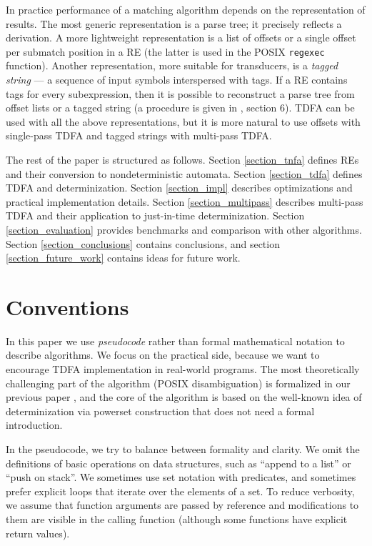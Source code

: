 \documentclass[]{article}
\begin{document}
In practice performance of a matching algorithm depends on the representation of results.
The most generic representation is a parse tree; it precisely reflects a derivation.
A more lightweight representation is a list of offsets or a single offset per submatch position in a RE
(the latter is used in the POSIX \texttt{regexec} function).
Another representation, more suitable for transducers, is a \emph{tagged string} ---
a sequence of input symbols interspersed with tags.
If a RE contains tags for every subexpression,
then it is possible to reconstruct a parse tree from offset lists or a tagged string (a procedure is given in \cite{BorTro19}, section 6).
TDFA can be used with all the above representations,
but it is more natural to use offsets with single-pass TDFA
and tagged strings with multi-pass TDFA.
\medskip

The rest of the paper is structured as follows.
Section \ref{section_tnfa} defines REs and their conversion to nondeterministic automata.
Section \ref{section_tdfa} defines TDFA and determinization.
Section \ref{section_impl} describes optimizations and practical implementation details.
Section \ref{section_multipass} describes multi-pass TDFA and their application to just-in-time determinization.
Section \ref{section_evaluation} provides benchmarks and comparison with other algorithms.
Section \ref{section_conclusions} contains conclusions,
and section \ref{section_future_work} contains ideas for future work.

\section*{Conventions}

In this paper we use \emph{pseudocode} rather than formal mathematical notation to describe algorithms.
We focus on the practical side, because we want to encourage TDFA implementation in real-world programs.
The most theoretically challenging part of the algorithm (POSIX disambiguation)
is formalized in our previous paper \cite{BorTro19},
and the core of the algorithm is based on the well-known idea of determinization via powerset construction
that does not need a formal introduction.
\medskip

In the pseudocode, we try to balance between formality and clarity.
We omit the definitions of basic operations on data structures, such as ``append to a list'' or ``push on stack''.
We sometimes use set notation with predicates, and sometimes prefer explicit loops that iterate over the elements of a set.
To reduce verbosity, we assume that function arguments are passed by reference and modifications to them are visible in the calling function
(although some functions have explicit return values).
\medskip
\end{document}
